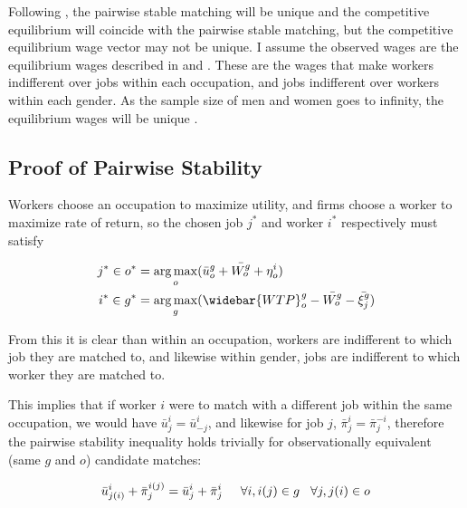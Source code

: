 \documentclass[12pt]{article}
\DeclareMathOperator*{\argmax}{arg\,max}
\begin{document}

Following , the pairwise stable matching will be unique and the competitive equilibrium will coincide with the pairwise stable matching, but the competitive equilibrium wage vector may not be unique. I assume the observed wages are the equilibrium wages described in  and . These are the wages that make workers indifferent over jobs within each occupation, and jobs indifferent over workers within each gender. As the sample size of men and women goes to infinity, the equilibrium wages will be unique \cite{Salanie2013a}.

\subsection{Proof of Pairwise Stability}\label{sec.Stability}

Workers choose an occupation to maximize utility, and firms choose a worker to maximize rate of return, so the chosen job $j^*$ and worker $i^*$ respectively must satisfy

\begin{align*}
j^* \in o^* &= \argmax_o ( \bar{u}^{g}_o + \bar{W^g_o}   + \eta^i_o ) \\
i^* \in g^* &= \argmax_g (\widebar{WTP}^g_o -  \bar{W^g_o} - \bar{\xi^g_j})
\end{align*}

From this it is clear than within an occupation, workers are indifferent to which job they are matched to, and likewise within gender, jobs are indifferent to which worker they are matched to.

This implies that if worker $i$ were to match with a different job within the same occupation, we would have $\bar{u}^{i}_j =\bar{u}^{i}_{-j}$, and likewise for job $j$, $\bar{\pi}^{i}_j = \bar{\pi}^{-i}_j $, therefore the pairwise stability inequality holds trivially for observationally equivalent (same $g$ and $o$) candidate matches:

$$\bar{u}^{i}_{j(i)}+ \bar{\pi}^{i(j)}_j = \bar{u}^{i}_{j} + \bar{\pi}^{i}_j \hspace{5mm} \forall i,i(j) \in g \hspace{3mm} \forall j,j(i) \in o$$
\end{document}
